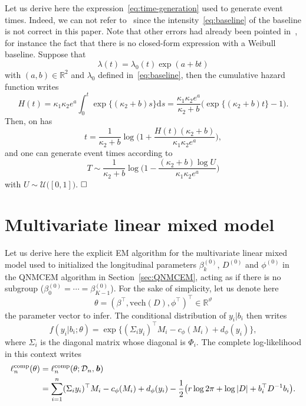 \documentclass[11pt]{article}
\newcommand{\dd}{\mathrm{d}}
\newcommand{\cD}{\mathcal D}
\newcommand{\cU}{\mathcal U}
\newcommand{\R}{\mathds R}
\begin{document}
Let us derive here the expression~\eqref{eq:time-generation} used to generate event times. Indeed, we can not refer to~\citet{austin2012generating} since the intensity~\eqref{eq:baseline} of the baseline is not correct in this paper.
Note that other errors had already been pointed in~\citep{austin2013correction}, for instance the fact that there is no closed-form expression with a Weibull baseline.
Suppose that
\[\lambda(t) = \lambda_0(t) \exp (a + b t)\]
with $(a, b) \in \R^2$ and $\lambda_0$ defined in~\eqref{eq:baseline}, then the cumulative hazard function writes
\[H(t) = \kappa_1 \kappa_2 e^a \int_0^t \exp\{(\kappa_2 + b)s \} \dd s = \dfrac{\kappa_1 \kappa_2 e^a}{\kappa_2 + b} \big( \exp\{(\kappa_2 + b) t\} - 1 \big).\]
Then, on has
\[t = \dfrac{1}{\kappa_2 + b} \log \Big( 1 + \dfrac{H(t)(\kappa_2 + b)}{\kappa_1 \kappa_2 e^a} \Big),\]
and one can generate event times according to
\[ T \sim \dfrac{1}{\kappa_2 + b} \log \Big( 1 - \dfrac{(\kappa_2 + b)\log U}{\kappa_1 \kappa_2 e^a} \Big) \]
with $U \sim \cU\big([0,1]\big)$.
$\hfill\square$

\section{Multivariate linear mixed model}
\label{sec:MLMM}

Let us derive here the explicit EM algorithm for the multivariate linear mixed model used to initialized the longitudinal parameters $\beta_k^{(0)}$, $D^{(0)}$ and $\phi^{(0)}$ in the QNMCEM algorithm in Section~\ref{sec:QNMCEM}, acting as if there is no subgroup ($\beta_0^{(0)} = \cdots = \beta_{K-1}^{(0)}$). 
For the sake of simplicity, let us denote here 
\[\theta = (\beta^\top, \text{vech}(D), \phi^\top)^\top \in \R^\vartheta\]
the parameter vector to infer.
The conditional distribution of $y_i|b_i$ then writes
\[f(y_i|b_i ; \theta) = \exp \big\{( \Sigma_iy_i)^\top M_{i} - c_\phi(M_{i}) + d_\phi(y_i) \big\},\]
where $\Sigma_i$ is the diagonal matrix whose diagonal is $\Phi_i$. 
The complete log-likelihood in this context writes
\begin{align*}
\ell_n^\text{comp}(\theta) &= \ell_n^\text{comp}(\theta ; \cD_n, \textbf{\textit{b}}) \\
&= \sum_{i=1}^n (\Sigma_iy_i)^\top M_{i} - c_\phi(M_{i}) + d_\phi(y_i) -\dfrac12 \big(r \log 2\pi + \log|D| + b_i^\top D^{-1}b_i\big).
\end{align*}
  
\end{document}
